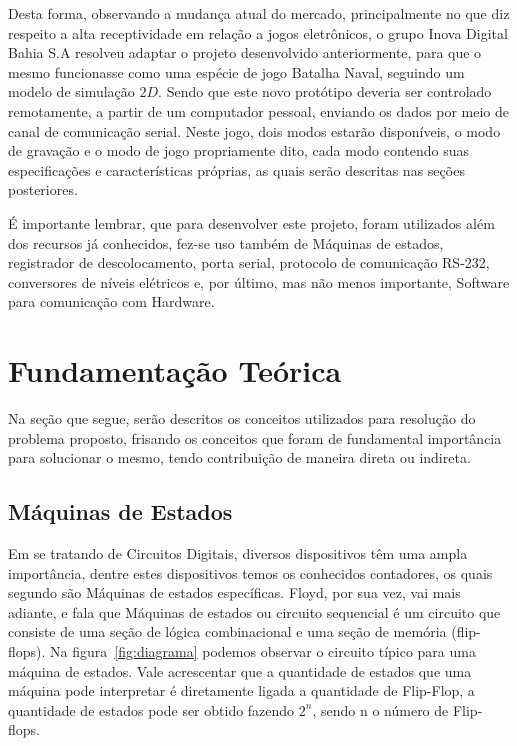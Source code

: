 \documentclass[12pt]{article}
\begin{document}
Desta forma, observando a mudança atual do mercado, principalmente no que diz respeito a alta receptividade em relação a jogos eletrônicos, o grupo Inova Digital Bahia S.A  resolveu adaptar o projeto desenvolvido anteriormente, para que o mesmo funcionasse como uma espécie de jogo Batalha Naval, seguindo um modelo de simulação $2D$. Sendo que este novo protótipo deveria ser controlado remotamente, a partir de um computador pessoal, enviando os dados por meio de canal de comunicação serial. Neste jogo, dois modos estarão disponíveis, o modo de gravação e o modo de jogo propriamente dito, cada modo contendo suas especificações e características próprias, as quais serão descritas nas seções posteriores.

É importante lembrar, que para desenvolver este projeto, foram utilizados além dos recursos já conhecidos, fez-se uso também de Máquinas de estados, registrador de descolocamento, porta serial, protocolo de comunicação RS-232, conversores de níveis elétricos e, por último, mas não menos importante, Software para comunicação com Hardware.

\section{Fundamentação Teórica}

Na seção que segue, serão descritos os conceitos utilizados para resolução do problema proposto, frisando os conceitos que foram de fundamental importância para solucionar o mesmo, tendo contribuição de maneira direta ou indireta.

\subsection{Máquinas de Estados}
Em se tratando de Circuitos Digitais, diversos dispositivos têm uma ampla importância, dentre estes dispositivos temos os conhecidos contadores, os quais segundo\cite{tocci1997digital} são Máquinas de estados específicas. Floyd, por sua vez, vai mais adiante, e fala que Máquinas de estados ou circuito sequencial é um circuito que  consiste de uma seção de lógica combinacional e uma seção de memória (flip-flops)\cite{floyd2011digital}. Na figura~\ref{fig:diagrama} podemos observar o circuito típico para uma máquina de estados. Vale acrescentar que a quantidade de estados que uma máquina pode interpretar é diretamente ligada a quantidade de Flip-Flop, a quantidade de estados pode ser obtido fazendo $2^{n}$, sendo n o número de Flip-flops.  
\end{document}
